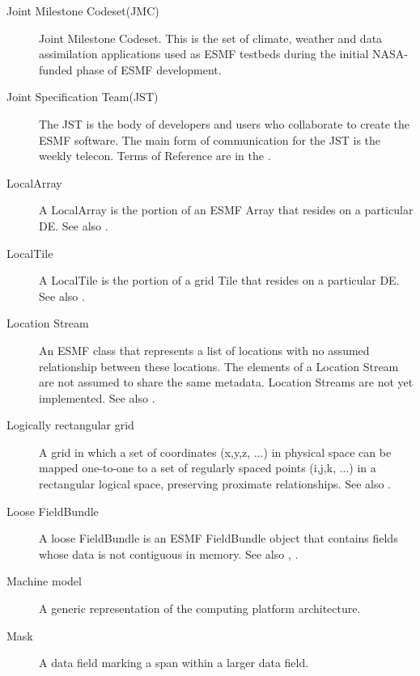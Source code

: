 \begin{description}
\label{glos:JMC} 
\item[Joint Milestone Codeset(JMC)] 
  Joint Milestone Codeset.  This is the set of climate, weather and
  data assimilation applications used as ESMF testbeds 
  during the initial NASA-funded phase of ESMF development.

\label{glos:JST}
\item[Joint Specification Team(JST)]
  The JST is the body of developers and users who collaborate
  to create the ESMF software.  The main form of communication for 
  the JST is the weekly telecon.  Terms of Reference are in the .

\label{glos:LocalArray}
\item[LocalArray]
  A LocalArray is the portion of an ESMF Array that resides on a 
  particular DE.  See also .

\label{glos:LocalTile}
\item[LocalTile]
  A LocalTile is the portion of a grid Tile that resides on a 
  particular DE.  See also .

\label{glos:LocStream} 
\item[Location Stream] 
  An ESMF class that represents
  a list of locations with no assumed relationship between these locations.  
  The elements of a Location Stream are not assumed to share the same 
  metadata. Location Streams are not yet implemented.
  See also .

\label{glos:LogRectGrid} 
\item[Logically rectangular grid] 
  A grid in which a set of coordinates (x,y,z, ...) in physical
  space can be mapped one-to-one to a set of regularly spaced 
  points (i,j,k, ...) in a rectangular logical space, preserving
  proximate relationships.  See also .

\label{glos:LooseFieldBundle} 
\item[Loose FieldBundle] 
  A loose FieldBundle 
  is an ESMF FieldBundle object that contains fields whose data is 
  not contiguous in memory.  See also ,
  .

\item[Machine model] A generic representation of the computing 
  platform architecture.

\label{glos:Mask} 
\item[Mask] 
  A data field marking a span within a larger data field.


\end{description}
